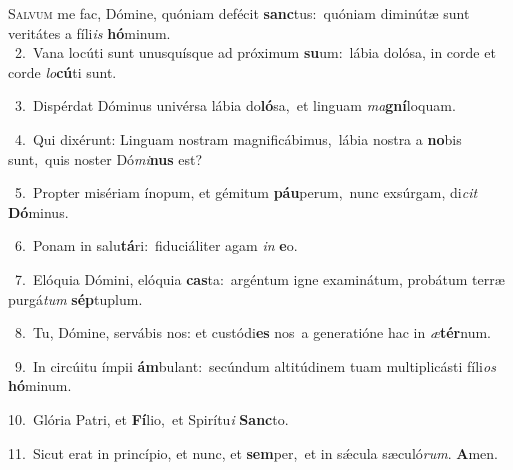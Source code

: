 \lettrine{\initial\textcolor{\initialcolor}{S}}{alvum} me fac, Dómine, quóniam defécit \textbf{sanc}\-tus:~\star quóniam diminútæ sunt veritátes a fíli\textit{is} \textbf{hó}\-minum.\\
{\numbfont\textcolor{\numbcolor}{~2.}}~Vana locúti sunt unusquísque ad próximum \textbf{su}\-um:~\star lábia dolósa, in corde et corde \textit{lo}\-\textbf{cú}ti sunt.\par
{\numbfont\textcolor{\numbcolor}{~3.}}~Dispérdat Dóminus univérsa lábia do\-\textbf{ló}\-sa,~\star et linguam \textit{ma}\-\textbf{gní}loquam.\par
{\numbfont\textcolor{\numbcolor}{~4.}}~Qui dixérunt: Linguam nostram magnificábimus,~\dagger lábia nostra a \textbf{no}\-bis sunt,~\star quis noster Dó\-\textit{mi}\-\textbf{nus} est?\par
{\numbfont\textcolor{\numbcolor}{~5.}}~Propter misériam ínopum, et gémitum \textbf{páu}\-perum,~\star nunc exsúrgam, di\textit{cit} \textbf{Dó}\-minus.\par
{\numbfont\textcolor{\numbcolor}{~6.}}~Ponam in salu\-\textbf{tá}\-ri:~\star fiduciáliter agam \textit{in} \textbf{e}\-o.\par
{\numbfont\textcolor{\numbcolor}{~7.}}~Elóquia Dómini, elóquia \textbf{cas}\-ta:~\star argéntum igne examinátum, probátum terræ purgá\textit{tum} \textbf{sép}\-tuplum.\par
{\numbfont\textcolor{\numbcolor}{~8.}}~Tu, Dómine, servábis nos: et custódi\textbf{es} nos~\star a generatióne hac in \textit{æ}\-\textbf{tér}num.\par
{\numbfont\textcolor{\numbcolor}{~9.}}~In circúitu ímpii \textbf{ám}\-bulant:~\star secúndum altitúdinem tuam multiplicásti fíli\textit{os} \textbf{hó}\-minum.\par
{\numbfont\textcolor{\numbcolor}{10.}}~Glória Patri, et \textbf{Fí}\-lio,~\star et Spirítu\textit{i} \textbf{Sanc}\-to.\par
{\numbfont\textcolor{\numbcolor}{11.}}~Sicut erat in princípio, et nunc, et \textbf{sem}\-per,~\star et in sǽcula sæculó\-\textit{rum}\-. \textbf{A}\-men.\par
